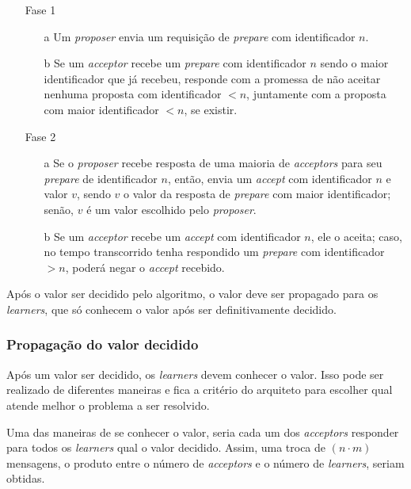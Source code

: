 \documentclass[
    12pt,
    openright, 
    oneside,
    a4paper,
    french,
    english,
    brazil
    ]{facom-ufu-abntex2}
\theoremstyle{definition}
\begin{document}
\begin{itemize}
    \item [Fase 1]
    \begin{itemize}
        \item [a] Um \emph{proposer} envia um requisição de \emph{prepare} com
        identificador $n$.
        
        \item [b] Se um \emph{acceptor} recebe um \emph{prepare} com identificador
        $n$ sendo o maior identificador que já recebeu, responde com a promessa de não
        aceitar nenhuma proposta com identificador $<n$, juntamente com a proposta com
        maior identificador $<n$, se existir.
    \end{itemize}
    
    \item [Fase 2]
    \begin{itemize}
        \item [a] Se o \emph{proposer} recebe resposta de uma maioria de \emph{acceptors}
        para seu \emph{prepare} de identificador $n$, então, envia um \emph{accept} 
        com identificador $n$ e valor $v$, sendo $v$ o valor da resposta de \emph{prepare}
        com maior identificador; senão, $v$ é um valor escolhido pelo \emph{proposer}.
        
        \item [b] Se um \emph{acceptor} recebe um \emph{accept} com identificador $n$,
        ele o aceita; caso, no tempo transcorrido tenha respondido um \emph{prepare}
        com identificador $>n$, poderá negar o \emph{accept} recebido.
    \end{itemize}
\end{itemize}

Após o valor ser decidido pelo algoritmo, o valor deve ser propagado para os \emph{learners},
que só conhecem o valor após ser definitivamente decidido.

\subsubsection{Propagação do valor decidido}
Após um valor ser decidido, os \emph{learners} devem conhecer o valor. Isso pode ser realizado
de diferentes maneiras e fica a critério do arquiteto para escolher qual atende melhor o
problema a ser resolvido.

Uma das maneiras de se conhecer o valor, seria cada um dos \emph{acceptors} responder para
todos os \emph{learners} qual o valor decidido. Assim, uma troca de $(n \cdot m)$ mensagens, 
o produto entre o número de \emph{acceptors} e o número de \emph{learners}, seriam obtidas.
\end{document}
